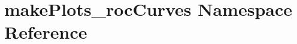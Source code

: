 \hypertarget{namespacemakePlots__rocCurves}{
\section{makePlots\_\-rocCurves Namespace Reference}
\label{namespacemakePlots__rocCurves}
}
